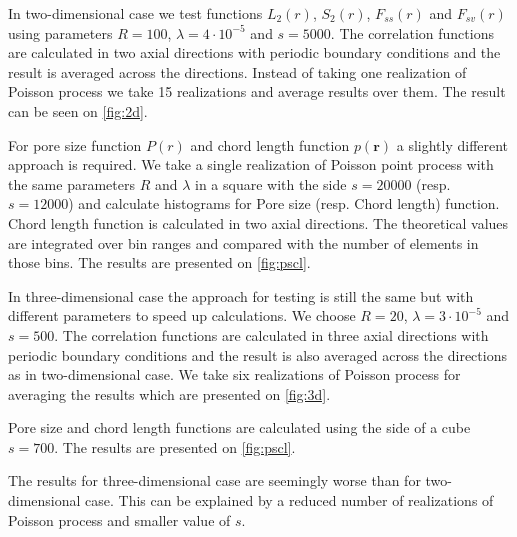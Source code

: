 \documentclass[reprint,amsmath,amssymb,aps,pre]{revtex4-1}
\begin{document}
In two-dimensional case we test functions $L_2(r)$, $S_2(r)$, $F_{ss}(r)$ and
$F_{sv}(r)$ using parameters $R = 100$, $\lambda = 4\cdot10^{-5}$ and
$s = 5000$. The correlation functions are calculated in two axial directions
with periodic boundary conditions and the result is averaged across the
directions. Instead of taking one realization of Poisson process we take 15
realizations and average results over them. The result can be seen on
\cref{fig:2d}.

For pore size function $P(r)$ and chord length function $p(\bm{r})$ a slightly
different approach is required. We take a single realization of Poisson point
process with the same parameters $R$ and $\lambda$ in a square with the side
$s = 20000$ (resp. $s = 12000$) and calculate histograms for Pore size
(resp. Chord length) function. Chord length function is calculated in two axial
directions. The theoretical values are integrated over bin ranges and compared
with the number of elements in those bins. The results are presented on
\cref{fig:pscl}.

In three-dimensional case the approach for testing is still the same but with
different parameters to speed up calculations. We choose $R = 20$,
$\lambda = 3\cdot10^{-5}$ and $s = 500$. The correlation functions are
calculated in three axial directions with periodic boundary conditions and the
result is also averaged across the directions as in two-dimensional
case. We take six realizations of Poisson process for averaging the results
which are presented on \cref{fig:3d}.

Pore size and chord length functions are calculated using the side of a cube
$s = 700$. The results are presented on \cref{fig:pscl}.

The results for three-dimensional case are seemingly worse than for
two-dimensional case. This can be explained by a reduced number of realizations
of Poisson process and smaller value of $s$.
\end{document}
